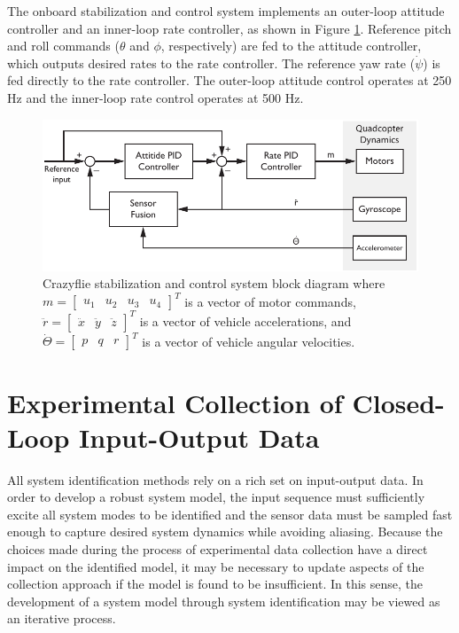 The onboard stabilization and control system implements an outer-loop attitude controller and an inner-loop rate controller, as shown in Figure \ref{fig:control_system_block_diagram}. Reference pitch and roll commands ($\theta$ and $\phi$, respectively) are fed to the attitude controller, which outputs desired rates to the rate controller. The reference yaw rate ($\dot\psi$) is fed directly to the rate controller. The outer-loop attitude control operates at 250 Hz and the inner-loop rate control operates at 500 Hz.
\begin{figure}[htb!]
	\centering
	\includegraphics{../fig/crazyflie_control_system_block_diagram.pdf}
	\caption[Crazyflie stabilization and control system block diagram.]{Crazyflie stabilization and control system block diagram where $m = \begin{bmatrix}u_1 & u_2 & u_3 & u_4\end{bmatrix}^T$ is a vector of motor commands, $\ddot r = \begin{bmatrix}\ddot{x}&\ddot{y}&\ddot{z}\end{bmatrix}^T$ is a vector of vehicle accelerations, and $\dot\Theta = \begin{bmatrix}p & q & r\end{bmatrix}^T$ is a vector of vehicle angular velocities.}
	\label{fig:control_system_block_diagram}
\end{figure}


\section{Experimental Collection of Closed-Loop Input-Output Data}
All system identification methods rely on a rich set on input-output data. In order to develop a robust system model, the input sequence must sufficiently excite all system modes to be identified and the sensor data must be sampled fast enough to capture desired system dynamics while avoiding aliasing. Because the choices made during the process of experimental data collection have a direct impact on the identified model, it may be necessary to update aspects of the collection approach if the model is found to be insufficient. In this sense, the development of a system model through system identification may be viewed as an iterative process.

